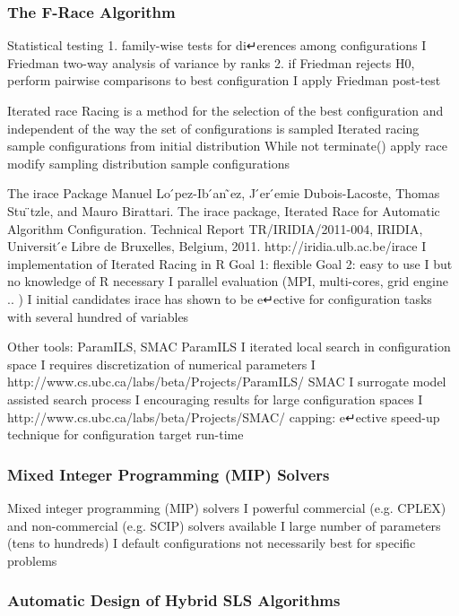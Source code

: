 \documentclass[a4paper,10pt]{article}
\begin{document}
	\subsubsection{The F-Race Algorithm}
		Statistical testing
1. family-wise tests for di↵erences among configurations I Friedman two-way analysis of variance by ranks
2. if Friedman rejects H0, perform pairwise comparisons to best configuration
I apply Friedman post-test
		
		
		Iterated race
 Racing is a method for the selection of the best configuration and independent of the way the set of configurations is sampled
Iterated racing
sample configurations from initial distribution While not terminate()
apply race
modify sampling distribution sample configurations
		
		
		The irace Package
Manuel Lo ́pez-Ib ́an ̃ez, J ́er ́emie Dubois-Lacoste, Thomas Stu ̈tzle, and Mauro Birattari. The irace package, Iterated Race for Automatic Algorithm Configuration. Technical Report TR/IRIDIA/2011-004, IRIDIA, Universit ́e Libre de Bruxelles, Belgium, 2011.
http://iridia.ulb.ac.be/irace
I implementation of Iterated Racing in R Goal 1: flexible
Goal 2: easy to use
I but no knowledge of R necessary
I parallel evaluation (MPI, multi-cores, grid engine .. ) I initial candidates
irace has shown to be e↵ective for configuration tasks with several hundred of variables
		
		
		Other tools: ParamILS, SMAC
 ParamILS
I iterated local search in configuration space
I requires discretization of numerical parameters
I http://www.cs.ubc.ca/labs/beta/Projects/ParamILS/
SMAC
I surrogate model assisted search process
I encouraging results for large configuration spaces
I http://www.cs.ubc.ca/labs/beta/Projects/SMAC/
capping: e↵ective speed-up technique for configuration target run-time
		
		\subsubsection{Mixed Integer Programming (MIP) Solvers}
		
		Mixed integer programming (MIP) solvers
I powerful commercial (e.g. CPLEX) and non-commercial (e.g. SCIP) solvers available
I large number of parameters (tens to hundreds)
I default configurations not necessarily best for specific
 problems
		
		
		\subsubsection{Automatic Design of Hybrid SLS Algorithms}
		
\end{document}

